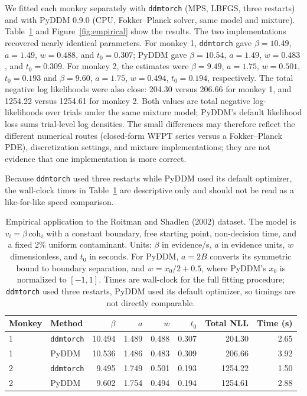 \documentclass[11pt]{article}
\begin{document}
We fitted each monkey separately with \texttt{ddmtorch} (MPS, LBFGS, three restarts) and with PyDDM 0.9.0 (CPU, Fokker--Planck solver, same model and mixture).  Table~\ref{tab:empirical} and Figure~\ref{fig:empirical} show the results.  The two implementations recovered nearly identical parameters.  For monkey 1, \texttt{ddmtorch} gave $\beta=10.49$, $a=1.49$, $w=0.488$, and $t_0=0.307$; PyDDM gave $\beta=10.54$, $a=1.49$, $w=0.483$, and $t_0=0.309$.  For monkey 2, the estimates were $\beta=9.49$, $a=1.75$, $w=0.501$, $t_0=0.193$ and $\beta=9.60$, $a=1.75$, $w=0.494$, $t_0=0.194$, respectively.  The total negative log likelihoods were also close: 204.30 versus 206.66 for monkey 1, and 1254.22 versus 1254.61 for monkey 2.  Both values are total negative log-likelihoods over trials under the same mixture model; PyDDM's default likelihood loss sums trial-level log densities.  The small differences may therefore reflect the different numerical routes (closed-form WFPT series versus a Fokker--Planck PDE), discretization settings, and mixture implementations; they are not evidence that one implementation is more correct.

Because \texttt{ddmtorch} used three restarts while PyDDM used its default optimizer, the wall-clock times in Table~\ref{tab:empirical} are descriptive only and should not be read as a like-for-like speed comparison.

\begin{table}[H]
\centering
\caption{Empirical application to the Roitman and Shadlen (2002) dataset.  The model is $v_i=\beta\,\mathrm{coh}_i$ with a constant boundary, free starting point, non-decision time, and a fixed 2\% uniform contaminant.  Units: $\beta$ in evidence/s, $a$ in evidence units, $w$ dimensionless, and $t_0$ in seconds.  For PyDDM, $a=2B$ converts its symmetric bound to boundary separation, and $w=x_0/2+0.5$, where PyDDM's \(x_0\) is normalized to \([-1,1]\).  Times are wall-clock for the full fitting procedure; \texttt{ddmtorch} used three restarts, PyDDM used its default optimizer, so timings are not directly comparable.}
\label{tab:empirical}
\begin{tabular}{llrrrrrr}
\toprule
Monkey & Method & $\beta$ & $a$ & $w$ & $t_0$ & Total NLL & Time (s) \\
\midrule
1 & \texttt{ddmtorch} & 10.494 & 1.489 & 0.488 & 0.307 & 204.30 & 2.65 \\
1 & PyDDM & 10.536 & 1.486 & 0.483 & 0.309 & 206.66 & 3.92 \\
2 & \texttt{ddmtorch} & 9.495 & 1.749 & 0.501 & 0.193 & 1254.22 & 1.50 \\
2 & PyDDM & 9.602 & 1.754 & 0.494 & 0.194 & 1254.61 & 2.88 \\
\bottomrule
\end{tabular}
\end{table}
\end{document}
